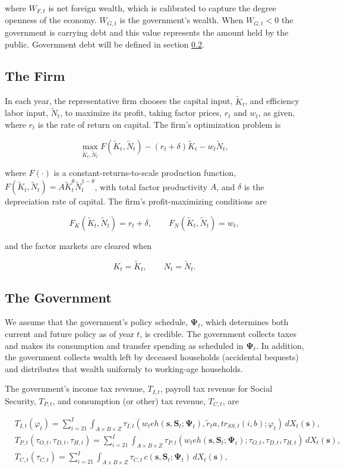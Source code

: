 \documentclass[11pt,leqno,fleqn]{article}
\newcommand{\be}{\vspace{-1em}\begin{singlespace}\begin{equation}}
\newcommand{\ee}{\end{equation}\end{singlespace}}
\begin{document}
where $W_{F,t}$ is net foreign wealth, which is calibrated to capture the degree  openness of the economy. $W_{G,t}$ is the government's wealth. When $W_{G,t}<0$ the government is carrying debt and this value represents the amount held by the public. Government debt will be defined in section \ref{govt}.

\subsection{The Firm}
In each year, the representative firm chooses the capital input, $\tilde{K}_{t}$, and efficiency labor input, $\tilde{N}_{t}$, to maximize its profit, taking factor prices, $r_{t}$ and $w_{t}$, as given, where $r_{t}$ is the rate of return on capital. The firm's optimization problem is

\be \max_{\tilde{K}_{t},\tilde{N}_{t}}F(\tilde{K}_{t},\tilde{N}_{t})-(r_{t}+\delta)\tilde{K}_{t}-w_{t}\tilde{N}_{t},\label{E:prof_fun} \ee
	
where $F(\cdot)$ is a constant-returns-to-scale production function, $F(\tilde{K}_{t},\tilde{N}_{t})=A\tilde{K}_{t}^{\theta}\tilde{N}_{t}^{1-\theta}$, with total factor productivity $A$, and $\delta$ is the depreciation rate of capital. The firm's profit-maximizing conditions are

\be F_{K}(\tilde{K}_{t},\tilde{N}_{t})=r_{t}+\delta,\qquad F_{N}(\tilde{K}_{t},\tilde{N}_{t})=w_{t},\label{E:foc} \ee
	
and the factor markets are cleared when

\be K_{t}=\tilde{K}_{t},\qquad N_{t}=\tilde{N}_{t}.\label{E:mkt_clr} \ee

\subsection{The Government} \label{govt}
We assume that the government's policy schedule, $\mathbf{\Psi}_{t}$, which determines both current and future policy as of year $t$, is credible. The government collects taxes and makes its consumption and transfer spending as scheduled in $\mathbf{\Psi}_{t}$. In addition, the government collects wealth left by deceased households (accidental bequests) and distributes that wealth uniformly to working-age households.

The government's income tax revenue, $T_{I,t}$, payroll tax revenue for Social Security, $T_{P,t}$, and consumption (or other) tax revenue, $T_{C,t}$, are

\begin{align}
	&T_{I,t}(\varphi_{t})=\sum_{i=21}^{I}\int_{A\times B\times Z}
	\tau_{I,t}(w_{t}eh(\mathbf{s},\mathbf{S}_{t};\mathbf{\Psi}_{t}),
	\tilde{r}_{t}a,tr_{SS,t}(i,b);\varphi_{t})\,
	dX_{t}(\mathbf{s}),\label{E:tax_i}\\
	&T_{P,t}(\tau_{O,t},\tau_{D,t},\tau_{H,t})
	=\sum_{i=21}^{I}\int_{A\times B\times Z}
	\tau_{P,t}(w_{t}eh(\mathbf{s},\mathbf{S}_{t};\mathbf{\Psi}_{t});
	\tau_{O,t},\tau_{D,t},\tau_{H,t})\,dX_{t}(\mathbf{s}),\\
	&T_{C,t}(\tau_{C,t})=\sum_{i=21}^{I}\int_{A\times B\times Z}\tau_{C,t}\,
	c(\mathbf{s},\mathbf{S}_{t};\!\mathbf{\Psi}_{t})\,
	dX_{t}(\mathbf{s}),
\end{align}
\end{document}
